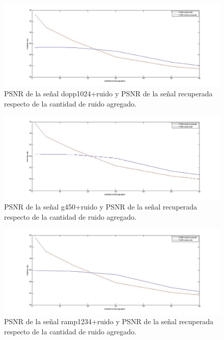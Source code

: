 \documentclass[10pt, a4paper]{article}
\begin{document}
\begin{itemize}
\begin{figure}[H] %
\begin{center}
\includegraphics[width=550pt]{./psnr_1024.jpg}
\caption[h]{PSNR de la señal dopp1024+ruido y PSNR de la señal recuperada respecto de la cantidad de ruido agregado.}
\end{center}
\end{figure}

\begin{figure}[H] %
\begin{center}
\includegraphics[width=550pt]{./psnr_450.jpg}
\caption[h]{PSNR de la señal g450+ruido y PSNR de la señal recuperada respecto de la cantidad de ruido agregado.}
\end{center}
\end{figure}

\begin{figure}[H] %
\begin{center}
\includegraphics[width=550pt]{./psnr_1234.jpg}
\caption[h]{PSNR de la señal ramp1234+ruido y PSNR de la señal recuperada respecto de la cantidad de ruido agregado.}
\end{center}
\end{figure}



\end{itemize}
\end{document}
